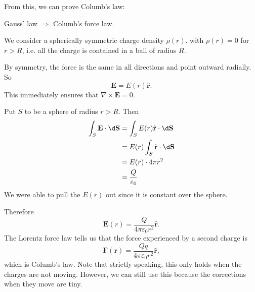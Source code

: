 \documentclass[a4paper]{article}
\begin{document}
From this, we can prove Columb's law:
\begin{eg}
  Gauss' law $\Rightarrow$ Columb's force law.

  We consider a spherically symmetric charge density $\rho (r)$. with $\rho (r) = 0$ for $r > R$, i.e. all the charge is contained in a ball of radius $R$.

  \begin{center}
  \end{center}

  By symmetry, the force is the same in all directions and point outward radially. So
  \[
    \mathbf{E} = E(r) \hat{\mathbf{r}}.
  \]
  This immediately ensures that $\nabla \times \mathbf{E} = 0$.

  Put $S$ to be a sphere of radius $r > R$. Then
  \begin{align*}
    \int_S \mathbf{E}\cdot \d \mathbf{S} &= \int_S E(r) \hat{\mathbf{r}}\cdot \d \mathbf{S}\\
    &= E(r) \int_S \hat{\mathbf{r}}\cdot \d \mathbf{S}\\
    &= E(r)\cdot 4\pi r^2\\
    &= \frac{Q}{\varepsilon_0}
  \end{align*}
  We were able to pull the $E(r)$ out since it is constant over the sphere.

  Therefore
  \[
    \mathbf{E}(r) = \frac{Q}{4\pi\varepsilon_0 r^2}\hat{\mathbf{r}}.
  \]
  The Lorentz force law tells us that the force experienced by a second charge is
  \[
    \mathbf{F}(\mathbf{r}) = \frac{Qq}{4\pi\varepsilon_0 r^2}\hat{\mathbf{r}},
  \]
  which is Columb's law. Note that strictly speaking, this only holds when the charges are not moving. However, we can still use this because the corrections when they move are tiny.
\end{eg}
\end{document}
